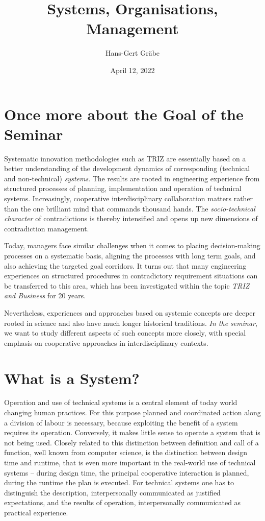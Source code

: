 \documentclass[11pt,a4paper]{article}
\title{Systems, Organisations, Management}
\author{Hans-Gert Gr\"abe}
\date{April 12, 2022}
\begin{document}
\maketitle

\section{Once more about the Goal of the Seminar}

Systematic innovation methodologies such as TRIZ are essentially based on a
better understanding of the development dynamics of corresponding (technical
and non-technical) \emph{systems}.  The results are rooted in engineering
experience from structured processes of planning, implementation and operation
of technical systems. Increasingly, cooperative interdisciplinary
collaboration matters rather than the one brilliant mind that commands
thousand hands. The \emph{socio-technical character} of contradictions is
thereby intensified and opens up new dimensions of contradiction management.

Today, managers face similar challenges when it comes to placing
decision-making processes on a systematic basis, aligning the processes with
long term goals, and also achieving the targeted goal corridors.  It turns out
that many engineering experiences on structured procedures in contradictory
requirement situations can be transferred to this area, which has been
investigated within the topic \emph{TRIZ and Business} for 20 years.

Nevertheless, experiences and approaches based on systemic concepts are deeper
rooted in science and also have much longer historical traditions.  \emph{In
  the seminar}, we want to study different aspects of such concepts more
closely, with special emphasis on cooperative approaches in interdisciplinary
contexts.

\section{What is a System?}

Operation and use of technical systems is a central element of today world
changing human practices. For this purpose planned and coordinated action
along a division of labour is necessary, because exploiting the benefit of a
system requires its operation. Conversely, it makes little sense to operate a
system that is not being used. Closely related to this distinction between
definition and call of a function, well known from computer science, is the
distinction between design time and runtime, that is even more important in
the real-world use of technical systems – during design time, the principal
cooperative interaction is planned, during the runtime the plan is
executed. For technical systems one has to distinguish the description,
interpersonally communicated as justified expectations, and the results of
operation, interpersonally communicated as practical experience.
\end{document}
